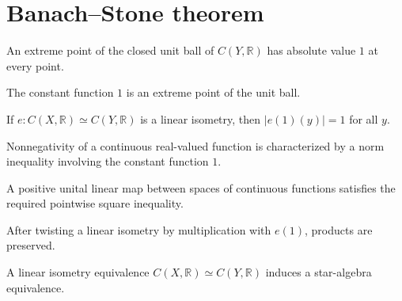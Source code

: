 \section{Banach--Stone theorem}

\begin{lemma}
\label{lem:bs-extreme}
\leanok
An extreme point of the closed unit ball of $C(Y,\mathbb R)$ has absolute value $1$ at every point.
\end{lemma}

\begin{lemma}
\label{lem:bs-one-extreme}
\leanok
The constant function $1$ is an extreme point of the unit ball.
\end{lemma}

\begin{lemma}
\label{lem:bs-one-image}
\leanok
{}
If $e:C(X,\mathbb R)\simeq C(Y,\mathbb R)$ is a linear isometry, then $|e(1)(y)|=1$ for all $y$.
\end{lemma}

\begin{lemma}
\label{lem:bs-positive}
\leanok
Nonnegativity of a continuous real-valued function is characterized by a norm inequality involving the constant function $1$.
\end{lemma}

\begin{lemma}
\label{lem:bs-square}
\leanok
{}
A positive unital linear map between spaces of continuous functions satisfies the required pointwise square inequality.
\end{lemma}

\begin{lemma}
\label{lem:bs-multiplicative}
\leanok
{}
After twisting a linear isometry by multiplication with $e(1)$, products are preserved.
\end{lemma}

\begin{definition}
\label{def:bs-star-equiv}
\leanok
{}
A linear isometry equivalence $C(X,\mathbb R)\simeq C(Y,\mathbb R)$ induces a star-algebra equivalence.
\end{definition}

